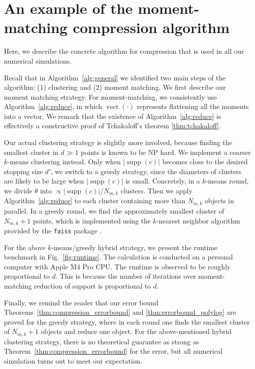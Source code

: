 \documentclass{article}
\theoremstyle{plain}
\newcommand{\supp}{\operatorname{supp}}
\begin{document}
\section{An example of the moment-matching compression algorithm}\label{app:algorithm}

Here, we describe the concrete algorithm for compression that is used in all our numerical simulations. 

Recall that in Algorithm~\ref{alg:general} we identified two main steps of the algorithm: (1) clustering and (2) moment matching. We first describe our moment matching strategy. For moment-matching, we consistently use Algorithm~\ref{alg:reduce}, in which $\operatorname{vect}(\cdot)$ represents flattening all the moments into a vector. We remark that the existence of Algorithm~\ref{alg:reduce} is effectively a constructive proof of Tchakaloff's theorem \ref{thm:tchakaloff}. 

Our actual clustering strategy is slightly more involved, because finding the smallest cluster in $d\gg 1$ points is known to be NP hard. We implement a coarser $k$-means clustering instead. Only when $|\supp(c)|$ becomes close to the desired stopping size $d'$, we switch to a greedy strategy, since the diameters of clusters are likely to be large when $|\supp(c)|$ is small. Concretely, in a $k$-means round, we divide $\theta$ into $\propto |\supp(c)|/N_{m,k}$ clusters. Then we apply Algorithm~\ref{alg:reduce} to each cluster containing more than $N_{m,k}$ objects in parallel. In a greedy round, we find the approximately smallest cluster of $N_{m,k}+1$ points, which is implemented using the $k$-nearest neighbor algorithm provided by the \texttt{faiss} package \citep{douze2024faiss}. 

For the above $k$-means/greedy hybrid strategy, we present the runtime benchmark in Fig.~\ref{fig:runtime}. The calculation is conducted on a personal computer with Apple M4 Pro CPU. The runtime is observed to be roughly proportional to $d$. This is because the number of iterations over moment-matching reduction of support is proportional to $d$. 

Finally, we remind the reader that our error bound Theorems~\ref{thm:compression_errorbound} and \ref{thm:errorbound_polylog} are proved for the greedy strategy, where in each round one finds the smallest cluster of $N_{m,k}+1$ objects and reduce one object. For the above-mentioned hybrid clustering strategy, there is no theoretical guarantee as strong as Theorem~\ref{thm:compression_errorbound} for the error, but all numerical simulation turns out to meet our expectation. 
\end{document}

